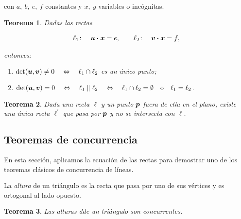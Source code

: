 \documentclass{article}
\theoremstyle{definicion}
\theoremstyle{definition}             %
\theoremstyle{definition}             %
\theoremstyle{definition}
\theoremstyle{definition}
\theoremstyle{observacion}
\theoremstyle{definition}
\theoremstyle{plain}
\newtheorem{theorem}{Teorema}
\theoremstyle{definition}
\theoremstyle{afirmacion}
\theoremstyle{notation}
\theoremstyle{definition}
\begin{document}
        con \(a,\ b,\ e,\ f\) constantes y \(x,\ y\) variables o incógnitas.

        \begin{theorem}
            Dadas las rectas

            \begin{equation*}
                \ell_{1} \colon\quad \vb*{u} \vdot \vb*{x} = e,\qquad \ell_{2} \colon\quad \vb*{v} \vdot \vb*{x} = f,
            \end{equation*}

            entonces:

            \begin{enumerate}[label = \textnormal{\Roman*)}]
                \item \(\det(\vb*{u}, \vb*{v}) \neq 0\quad \Leftrightarrow\quad \ell_{1} \cap \ell_{2}\) es un único punto;
                \item \(\det(\vb*{u}, \vb*{v}) = 0\quad \Leftrightarrow\quad \ell_{1} \parallel \ell_{2}\quad \Leftrightarrow\quad \ell_{1} \cap \ell_{2} = \emptyset\quad \text{o}\quad \ell_{1} = \ell_{2}\).
            \end{enumerate}
        \end{theorem}
        
        \begin{theorem}
            Dada una recta \(\ell\) y un punto \(\vb*{p}\) fuera de ella en el plano, existe una única recta \(\ell^{\prime}\) que pasa por \(\vb*{p}\) y no se intersecta con \(\ell\).
        \end{theorem}

        \subsection{Teoremas de concurrencia}

        En esta sección, aplicamos la ecuación de las rectas para demostrar uno de los teoremas clásicos de concurrencia de líneas.

        La \emph{altura} de un triángulo es la recta que pasa por uno de sus vértices y es ortogonal al lado opuesto.

        \begin{theorem}
            Las alturas dde un triángulo son concurrentes.
        \end{theorem}
\end{document}
